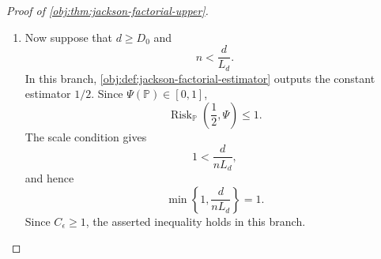 \begin{proof}[Proof of \cref{obj:thm:jackson-factorial-upper}]
\begin{enumerate}
\(u=(n-2)\epsilon/2\), and the condition \(n\ge4\) give
\[
\Lambda_{n,x}\le \frac{4}{n\epsilon}.
\]
Using \(p_x\le1\) and \(n^{-2}\le n^{-1}\), we obtain
\[
E_{\mathbb P}\delta_{a,x}^2
\le
4E_{\mathbb P}\{(\delta^{\mathrm{res}}_{a,x})^2\}
+
2E_{\mathbb P}\{(\delta^{\mathrm{cell}}_{a,x})^2\}
+
4E_{\mathbb P}\{(\delta^{\mathrm{zero}}_{a,x})^2\}
\le
\frac{100\Xi_\epsilon}{n}.
\]
Moreover,
\[
\widehat V_{n,2}^{\mathrm{ER}}
=
\sum_{x=1}^2 \max\{\zeta_{0,x},\zeta_{1,x}\},
\qquad
\Psi(\mathbb P)
=
\sum_{x=1}^2 \max\{\zeta^0_{0,x},\zeta^0_{1,x}\}.
\]
The maximum map is one-Lipschitz in the sup norm, and Cauchy--Schwarz over the
four pairs \((a,x)\) yields
\[
\left(
\widehat V_{n,2}^{\mathrm{ER}}-\Psi(\mathbb P)
\right)^2
\le
4\sum_{x=1}^2\sum_{a\in\{0,1\}}\delta_{a,x}^2 .
\]
Therefore
\[
\operatorname{Risk}_{\mathbb P}
(\widehat V_{n,2}^{\mathrm{ER}},\Psi)
\le
\frac{1600\Xi_\epsilon}{n}.
\]
Since \(n\ge4\), \(L_2\ge1\), and \(L_2\le2\),
\[
\min\left\{1,\frac{2}{nL_2}\right\}
=
\frac{2}{nL_2},
\qquad
\frac{1600\Xi_\epsilon}{n}
\le
C_\epsilon\frac{2}{nL_2}.
\]

If \(n\le3\), the empirical ratios lie in \([0,1]\), their weights sum to
one, and therefore
\[
0\le \widehat V_{n,2}^{\mathrm{ER}}\le1.
\]
Together with \(0\le\Psi(\mathbb P)\le1\), this gives
\[
\operatorname{Risk}_{\mathbb P}
(\widehat V_{n,2}^{\mathrm{ER}},\Psi)
\le1 .
\]
Also
\[
\frac13\le \frac{2}{nL_2},
\qquad
\frac13\le1,
\]
so
\[
\frac13\le
\min\left\{1,\frac{2}{nL_2}\right\}.
\]
Since \(C_\epsilon\ge3\), the desired bound follows throughout the
bounded-alphabet branch.

\item Now suppose that \(d\ge D_0\) and
\[
n<\frac{d}{L_d}.
\]
In this branch, \cref{obj:def:jackson-factorial-estimator} outputs the constant
estimator \(1/2\).  Since \(\Psi(\mathbb P)\in[0,1]\),
\[
\operatorname{Risk}_{\mathbb P}\left(\frac12,\Psi\right)\le1 .
\]
The scale condition gives
\[
1<\frac{d}{nL_d},
\]
and hence
\[
\min\left\{1,\frac{d}{nL_d}\right\}=1 .
\]
Since \(C_\epsilon\ge1\), the asserted inequality holds in this branch.


\end{enumerate}
\end{proof}
